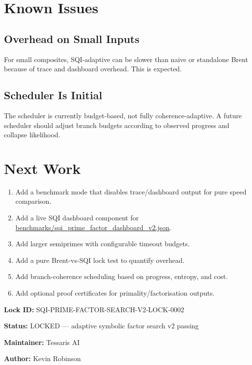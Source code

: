 \documentclass[11pt,a4paper]{article}
\begin{document}
\section{Known Issues}

\subsection{Overhead on Small Inputs}

For small composites, SQI-adaptive can be slower than naive or standalone Brent because of
trace and dashboard overhead. This is expected.

\subsection{Scheduler Is Initial}

The scheduler is currently budget-based, not fully coherence-adaptive. A future scheduler should
adjust branch budgets according to observed progress and collapse likelihood.

\section{Next Work}

\begin{enumerate}
  \item Add a benchmark mode that disables trace/dashboard output for pure speed comparison.
  \item Add a live SQI dashboard component for \url{benchmarks/sqi_prime_factor_dashboard_v2.json}.
  \item Add larger semiprimes with configurable timeout budgets.
  \item Add a pure Brent-vs-SQI lock test to quantify overhead.
  \item Add branch-coherence scheduling based on progress, entropy, and cost.
  \item Add optional proof certificates for primality/factorisation outputs.
\end{enumerate}

\bigskip

\noindent\textbf{Lock ID:} SQI-PRIME-FACTOR-SEARCH-V2-LOCK-0002

\noindent\textbf{Status:} LOCKED --- adaptive symbolic factor search v2 passing

\noindent\textbf{Maintainer:} Tessaris AI

\noindent\textbf{Author:} Kevin Robinson
\end{document}
